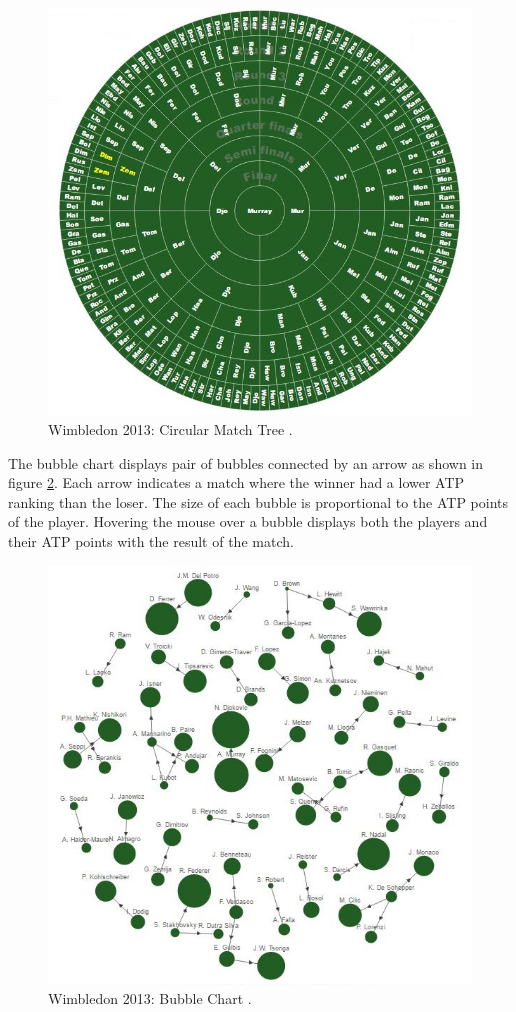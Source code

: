 \documentclass[9pt,twocolumn,twoside]{../../styles/osajnl}
\begin{document}
\begin{figure}[h]
\centering
\includegraphics[scale=0.4]{images/1}
\centering
\caption{Wimbledon 2013: Circular Match Tree \cite{www-cmt}.}
\label{fig:circular tree}
\end{figure}

The bubble chart displays pair of bubbles connected by an arrow as shown in figure \ref{fig:bubble chart}. Each arrow indicates a match where the winner had a lower ATP ranking than the loser. The size of each bubble is proportional to the ATP points of the player. Hovering the mouse over a bubble displays both the players and their ATP points with the result of the match. 

\begin{figure}[h]
\centering
\includegraphics[scale=0.5]{images/2}
\centering
\caption{Wimbledon 2013: Bubble Chart \cite{www-bubble}.}
\label{fig:bubble chart}
\end{figure}
\end{document}
